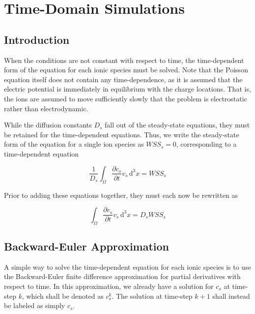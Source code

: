 
\section{Time-Domain Simulations}\label{sec:timedomain}

\subsection{Introduction}\label{subsec:timedomain_intro}

When the conditions are not constant with respect to time,
the time-dependent form of the equation for each ionic species must be solved.
Note that the Poisson equation itself does not contain any time-dependence,
as it is assumed that the electric potential is immediately in equilibrium with the charge locations.
That is, the ions are assumed to move sufficiently slowly that the problem
is electrostatic rather than electrodynamic.

While the diffusion constants $D_s$ fall out of the steady-state equations,
they must be retained for the time-dependent equations.
Thus, we write the steady-state form of the equation for a single ion species as
$WSS_s = 0$,
corresponding to a time-dependent equation

\begin{equation}
\frac{1}{D_s} \int_\Omega \frac{\partial c_s}{\partial t} v_s \,\mathrm{d}^3x
= WSS_s
\end{equation}

Prior to adding these equations together, they must each now be rewritten as

\begin{equation}
\int_\Omega \frac{\partial c_s}{\partial t} v_s \,\mathrm{d}^3x
= D_s WSS_s
\end{equation}


\subsection{Backward-Euler Approximation}\label{subsec:backward_euler}

A simple way to solve the time-dependent equation for each ionic species is to use the Backward-Euler
finite difference approximation for partial derivatives with respect to time.
In this approximation, we already have a solution for $c_s$ at time-step $k$,
which shall be denoted as $c_s^k$.
The solution at time-step $k+1$ shall instead be labeled as simply $c_s$.

